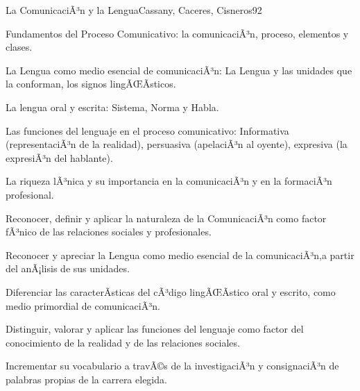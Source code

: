 \begin{syllabus}
\begin{unit}{La ComunicaciÃ³n y la Lengua}{Cassany, Caceres, Cisneros}{9}{2}
\begin{topics}
      \item Fundamentos del Proceso Comunicativo: la comunicaciÃ³n, proceso, elementos y clases. 
      \item La Lengua como medio esencial de comunicaciÃ³n: La Lengua y las unidades que  la conforman, los signos lingÃŒÃ­sticos.
      \item La lengua oral y escrita: Sistema, Norma y Habla. 
      \item Las funciones del lenguaje en el proceso comunicativo: Informativa (representaciÃ³n de la realidad), persuasiva (apelaciÃ³n al oyente), expresiva (la expresiÃ³n del hablante).
      \item La riqueza lÃ³nica y su importancia en la comunicaciÃ³n y en la formaciÃ³n profesional.
\end{topics}
\begin{unitgoals}
   \item Reconocer, definir y aplicar la naturaleza de la ComunicaciÃ³n como factor fÃ³nico de las relaciones sociales y profesionales.
   \item Reconocer y apreciar la Lengua como medio esencial de la comunicaciÃ³n,a partir del anÃ¡lisis de sus unidades.
   \item Diferenciar las caracterÃ­sticas del cÃ³digo lingÃŒÃ­stico oral y escrito,
   como medio primordial de comunicaciÃ³n.
   \item Distinguir, valorar y aplicar las funciones del lenguaje como factor del conocimiento de la realidad y de las relaciones sociales.
   \item Incrementar su vocabulario a travÃ©s de la investigaciÃ³n y consignaciÃ³n de palabras propias de la carrera elegida.
\end{unitgoals}

\end{unit}


\end{syllabus}
